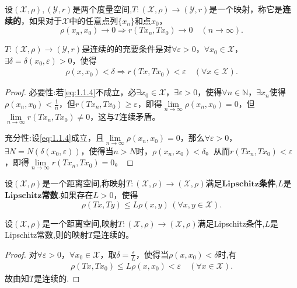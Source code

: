\documentclass[../../main.tex]{subfiles}%
\begin{document}
\begin{definition}
设$(\mathscr{X}, \rho), (\mathscr{Y}, r)$是两个度量空间,$T: (\mathscr{X}, \rho) \to (\mathscr{Y}, r)$是一个映射，称它是\textbf{连续的}，如果对于$\mathscr{X}$中的任意点列$\{x_n\}$和点$x_0$，
$$\rho(x_n, x_0) \to 0 \Rightarrow r(Tx_n, Tx_0) \to 0 \quad (n \to \infty).$$
\end{definition}

\begin{proposition}[连续映射充要条件]\label{proposition:距离空间的连续映射充要条件}
$T: (\mathscr{X}, \rho) \to (\mathscr{Y}, r)$是连续的的充要条件是对$\forall \varepsilon > 0$，$\forall x_0 \in \mathscr{X}$，$\exists \delta = \delta(x_0, \varepsilon) > 0$，使得
\begin{align}
\label{eq:1.1.4}
\rho(x, x_0) < \delta \Rightarrow r(Tx, Tx_0) < \varepsilon \quad (\forall x \in \mathscr{X}).
\end{align}
\end{proposition}
\begin{proof}

{\heiti 必要性:}若\eqref{eq:1.1.4}不成立，必$\exists x_0 \in \mathscr{X}$，$\exists \varepsilon > 0$，使得$\forall n \in \mathbb{N}$，$\exists x_n$使得$\rho(x_n, x_0) < \frac{1}{n}$，但$r(Tx_n, Tx_0) \geqslant \varepsilon$，即得$\lim\limits_{n \to \infty} \rho(x_n, x_0) = 0$，但$\lim\limits_{n \to \infty} r(Tx_n, Tx_0) \neq 0$，这与$T$连续矛盾。

{\heiti 充分性:}设\eqref{eq:1.1.4}成立，且$\lim\limits_{n \to \infty} \rho(x_n, x_0) = 0$，那么$\forall \varepsilon > 0$，$\exists N = N(\delta(x_0, \varepsilon))$，使得当$n > N$时，$\rho(x_n, x_0) < \delta$。从而$r(Tx_n, Tx_0) < \varepsilon$，即得$\lim\limits_{n \to \infty} r(Tx_n, Tx_0) = 0$。
\end{proof}

\begin{definition}
设$(\mathscr{X},\rho)$是一个距离空间,称映射$T:(\mathscr{X},\rho) \to (\mathscr{X},\rho)$满足$\mathbf{Lipschitz}$\textbf{条件},$L$是$\mathbf{Lipschitz}$\textbf{常数}.如果存在$L >0$，使得$$\rho(Tx,Ty) \leqslant L\rho(x,y)\,(\forall x,y \in \mathscr{X}).$$
\end{definition}

\begin{theorem}\label{theorem:满足Lipschitz条件的映射必连续}
设$(\mathscr{X},\rho)$是一个距离空间,映射$T:(\mathscr{X},\rho) \to (\mathscr{X},\rho)$满足Lipschitz条件,$L$是Lipschitz常数,则的映射$T$是连续的。
\end{theorem}
\begin{proof}
对$\forall \varepsilon > 0$，$\forall x_0 \in \mathscr{X}$，取$\delta=\frac{\varepsilon}{L}$，使得当$\rho(x, x_0) < \delta$时,有
\begin{align*}
\rho \left( Tx,Tx_0 \right) \leqslant L\rho \left( x,x_0 \right) <\varepsilon \quad \left( \forall x\in \mathscr{X} \right) .
\end{align*}
故由知$T$是连续的.
\end{proof}
\end{document}

